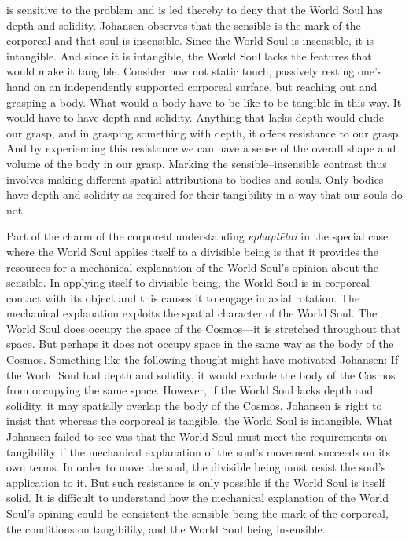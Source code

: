\citet[140--2]{Johansen:2004dx} is sensitive to the problem and is led thereby to deny that the World Soul has depth and solidity. Johansen observes that the sensible is the mark of the corporeal and that soul is insensible. Since the World Soul is insensible, it is intangible. And since it is intangible, the World Soul lacks the features that would make it tangible. Consider now not static touch, passively resting one's hand on an independently supported corporeal surface, but reaching out and grasping a body. What would a body have to be like to be tangible in this way. It would have to have depth and solidity. Anything that lacks depth would elude our grasp, and in grasping something with depth, it offers resistance to our grasp. And by experiencing this resistance we can have a sense of the overall shape and volume of the body in our grasp. Marking the sensible--insensible contrast thus involves making different spatial attributions to bodies and souls. Only bodies have depth and solidity as required for their tangibility in a way that our souls do not.

Part of the charm of the corporeal understanding \emph{ephaptētai} in the special case where the World Soul applies itself to a divisible being is that it provides the resources for a mechanical explanation of the World Soul's opinion about the sensible. In applying itself to divisible being, the World Soul is in corporeal contact with its object and this causes it to engage in axial rotation. The mechanical explanation exploits the spatial character of the World Soul. The World Soul does occupy the space of the Cosmos---it is stretched throughout that space. But perhaps it does not occupy space in the same way as the body of the Cosmos. Something like the following thought might have motivated Johansen: If the World Soul had depth and solidity, it would exclude the body of the Cosmos from occupying the same space. However, if the World Soul lacks depth and solidity, it may spatially overlap the body of the Cosmos. Johansen is right to insist that whereas the corporeal is tangible, the World Soul is intangible. What Johansen failed to see was that the World Soul must meet the requirements on tangibility if the mechanical explanation of the soul's movement succeeds on its own terms. In order to move the soul, the divisible being must resist the soul's application to it. But such resistance is only possible if the World Soul is itself solid. It is difficult to understand how the mechanical explanation of the World Soul's opining could be consistent the sensible being the mark of the corporeal, the conditions on tangibility, and the World Soul being insensible.

